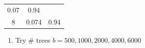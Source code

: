 \documentclass[]{article}
\providecommand{\tightlist}{%
  \setlength{\itemsep}{0pt}\setlength{\parskip}{0pt}}
\begin{document}
\begin{longtable}[]{@{}ccc@{}}
\begin{minipage}[t]{0.10\columnwidth}
0.07\strut
\end{minipage} & \begin{minipage}[t]{0.13\columnwidth}\centering\strut
0.94\strut
\end{minipage}\tabularnewline
\begin{minipage}[t]{0.05\columnwidth}\centering\strut
8\strut
\end{minipage} & \begin{minipage}[t]{0.10\columnwidth}\centering\strut
0.074\strut
\end{minipage} & \begin{minipage}[t]{0.13\columnwidth}\centering\strut
0.94\strut
\end{minipage}\tabularnewline
\bottomrule
\end{longtable}

\begin{enumerate}
\def\labelenumi{\arabic{enumi}.}
\setcounter{enumi}{2}
\tightlist
\item
  Try \# trees \(b = 500, 1000, 2000, 4000, 6000\)
\end{enumerate}
\end{document}
